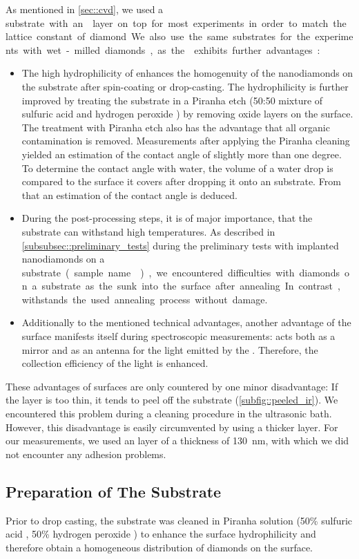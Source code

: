 	As mentioned in \autoref{sec::cvd}, we used a \si substrate with an \ir layer on top for most experiments in order to match the lattice constant of diamond.
	We also use the same substrates for the experiments with wet-milled diamonds, as the \ir exhibits further advantages:
	\begin{itemize}
		\item The high hydrophilicity of \ir {} enhances the homogenuity of the nanodiamonds on the substrate after spin-coating or drop-casting. 
		The hydrophilicity is further improved by treating the substrate in a Piranha etch (50:50 mixture of sulfuric acid  and hydrogen peroxide ) by removing oxide layers on the surface. 
		The treatment with Piranha etch also has the advantage that all organic contamination is removed.
		Measurements after applying the Piranha cleaning yielded an estimation of the contact angle of slightly more than one degree.
		To determine the contact angle with water, the volume of a water drop is compared to the surface it covers after dropping it onto an \ir substrate.
		From that an estimation of the contact angle is deduced.
		\item During the post-processing steps, it is of major importance, that the substrate can withstand high temperatures.
		As described in \autoref{subsubsec::preliminary_tests} during the preliminary tests with implanted nanodiamonds on a \si substrate (sample name ), we encountered difficulties with diamonds on a \si substrate as the sunk into the surface after annealing.
		In contrast, \ir withstands the used annealing process without damage.
		\item Additionally to the mentioned technical advantages, another advantage of the \ir surface manifests itself during spectroscopic measurements: 
{}		\Ir acts both as a mirror and as an antenna for the \fl light emitted by the \siv \cite{Neu2012a}.
		Therefore, the collection efficiency of the \fl light is enhanced.
	\end{itemize}
	These advantages of \ir surfaces are only countered by one minor disadvantage:
	If the \ir layer is too thin, it tends to peel off the substrate (\autoref{subfig::peeled_ir}).
	We encountered this problem during a cleaning procedure in the ultrasonic bath.
	However, this disadvantage is easily circumvented by using a thicker \ir layer.
	For our measurements, we used an \ir layer of a thickness of \SI{130}{nm}, with which we did not encounter any adhesion problems.

	\subsection{Preparation of The Substrate}

	Prior to drop casting, the substrate was cleaned in Piranha solution (50\% sulfuric acid , 50\% hydrogen peroxide ) to enhance the surface hydrophilicity and therefore obtain a homogeneous distribution of diamonds on the surface.